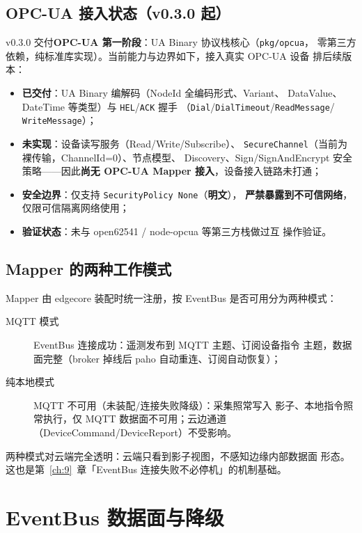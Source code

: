\subsection{OPC-UA 接入状态（v0.3.0 起）}

v0.3.0 交付\textbf{OPC-UA 第一阶段}：UA Binary 协议栈核心（\texttt{pkg/opcua}，
零第三方依赖，纯标准库实现）。当前能力与边界如下，接入真实 OPC-UA 设备
排后续版本：

\begin{itemize}
  \item \textbf{已交付}：UA Binary 编解码（NodeId 全编码形式、Variant、
        DataValue、DateTime 等类型）与 \texttt{HEL}/\texttt{ACK} 握手
        （\texttt{Dial}/\texttt{DialTimeout}/\texttt{ReadMessage}/
        \texttt{WriteMessage}）；
  \item \textbf{未实现}：设备读写服务（Read/Write/Subscribe）、
        \texttt{SecureChannel}（当前为裸传输，ChannelId=0）、节点模型、
        Discovery、Sign/SignAndEncrypt 安全策略——因此\textbf{尚无 OPC-UA
        Mapper 接入}，设备接入链路未打通；
  \item \textbf{安全边界}：仅支持 \texttt{SecurityPolicy None}（\textbf{明文}），
        \textbf{严禁暴露到不可信网络}，仅限可信隔离网络使用；
  \item \textbf{验证状态}：未与 open62541 / node-opcua 等第三方栈做过互
        操作验证。
\end{itemize}

\subsection{Mapper 的两种工作模式}

Mapper 由 edgecore 装配时统一注册，按 EventBus 是否可用分为两种模式：

\begin{description}
  \item[MQTT 模式] EventBus 连接成功：遥测发布到 MQTT 主题、订阅设备指令
        主题，数据面完整（broker 掉线后 paho 自动重连、订阅自动恢复）；
  \item[纯本地模式] MQTT 不可用（未装配/连接失败降级）：采集照常写入
        影子、本地指令照常执行，仅 MQTT 数据面不可用；云边通道
        （DeviceCommand/DeviceReport）不受影响。
\end{description}

两种模式对云端完全透明：云端只看到影子视图，不感知边缘内部数据面
形态。这也是第~\ref{ch:9}~章「EventBus 连接失败不必停机」的机制基础。

\section{EventBus 数据面与降级}

